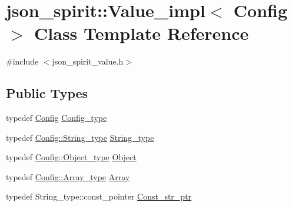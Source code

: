 \hypertarget{classjson__spirit_1_1_value__impl}{}\section{json\+\_\+spirit\+:\+:Value\+\_\+impl$<$ Config $>$ Class Template Reference}
\label{classjson__spirit_1_1_value__impl}


{\ttfamily \#include $<$json\+\_\+spirit\+\_\+value.\+h$>$}

\subsection*{Public Types}
\begin{DoxyCompactItemize}
\item 
typedef \hyperlink{namespacejson__spirit_aaf9079ef41a2fa7db0861c24b89d4254}{Config} \hyperlink{classjson__spirit_1_1_value__impl_a5dc93efdb2aae96d96c9fedf37ace554}{Config\+\_\+type}
\item 
typedef \hyperlink{structjson__spirit_1_1_config__vector_a9f0a96da6042290c5bc25c1b3269e747}{Config\+::\+String\+\_\+type} \hyperlink{classjson__spirit_1_1_value__impl_a7af638128a4e0dd86ab33c989c3e5ebf}{String\+\_\+type}
\item 
typedef \hyperlink{structjson__spirit_1_1_config__vector_a070c3d1a0aea6da7c24a60400d52f15d}{Config\+::\+Object\+\_\+type} \hyperlink{classjson__spirit_1_1_value__impl_ac4467b91c71f897bab0c6d74864ae991}{Object}
\item 
typedef \hyperlink{structjson__spirit_1_1_config__vector_af33059c26ec27a5153b53dd4bd312815}{Config\+::\+Array\+\_\+type} \hyperlink{classjson__spirit_1_1_value__impl_a8cbad4704c204a3421817f08a0b44dd6}{Array}
\item 
typedef String\+\_\+type\+::const\+\_\+pointer \hyperlink{classjson__spirit_1_1_value__impl_ae789c7abc9da932853db9493ddbe6101}{Const\+\_\+str\+\_\+ptr}
\end{DoxyCompactItemize}
